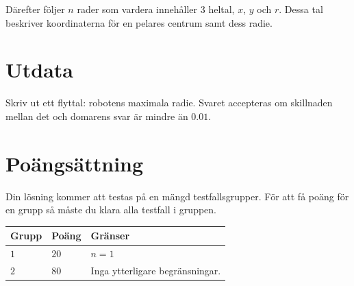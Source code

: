 Därefter följer $n$ rader som vardera innehåller 3 heltal, $x$, $y$ och $r$. Dessa tal beskriver koordinaterna
för en pelares centrum samt dess radie.


\section*{Utdata}
Skriv ut ett flyttal: robotens maximala radie. Svaret accepteras om skillnaden mellan det och domarens
svar är mindre än $0.01$.

\section*{Poängsättning}
Din lösning kommer att testas på en mängd testfallsgrupper.
För att få poäng för en grupp så måste du klara alla testfall i gruppen.

\noindent
\begin{tabular}{| l | l | p{12cm} |}
  \hline
  \textbf{Grupp} & \textbf{Poäng} & \textbf{Gränser} \\ \hline
  $1$    & $20$       & $n = 1$ \\ \hline
  $2$    & $80$       & Inga ytterligare begränsningar. \\ \hline
\end{tabular}
